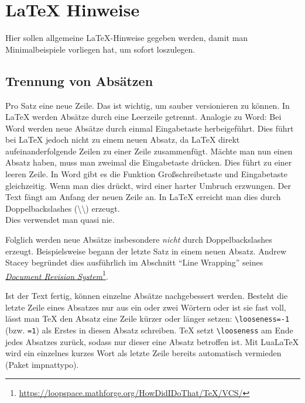 \documentclass[../main-german]{subfiles}
\begin{document}
\chapter{LaTeX Hinweise}
\label{sec:latexhints}

Hier sollen allgemeine \LaTeX-Hinweise gegeben werden, damit man Minimalbeispiele vorliegen hat, um sofort loszulegen.

\section{Trennung von Absätzen}

\begin{ltgexample}
Pro Satz eine neue Zeile.
Das ist wichtig, um sauber versionieren zu können.
In LaTeX werden Absätze durch eine Leerzeile getrennt.
Analogie zu Word: Bei Word werden neue Absätze durch einmal Eingabetaste herbeigeführt.
Dies führt bei LaTeX jedoch nicht zu einem neuen Absatz, da LaTeX direkt aufeinanderfolgende Zeilen zu einer Zeile zusammenfügt.
Mächte man nun einen Absatz haben, muss man zweimal die Eingabetaste drücken.
Dies führt zu einer leeren Zeile.
In Word gibt es die Funktion Großschreibetaste und Eingabetaste gleichzeitig.
Wenn man dies drückt, wird einer harter Umbruch erzwungen.
Der Text fängt am Anfang der neuen Zeile an.
In LaTeX erreicht man dies durch Doppelbackslashes (\textbackslash\textbackslash) erzeugt.
\\
Dies verwendet man quasi nie.

Folglich werden neue Absätze insbesondere \emph{nicht} durch Doppelbackslashes erzeugt.
Beispielsweise begann der letzte Satz in einem neuen Absatz.
Andrew Stacey begründet dies ausführlich im Abschnitt \enquote{Line Wrapping} seines \href{https://loopspace.mathforge.org/HowDidIDoThat/TeX/VCS/#section.3}{\emph{Document Revision System}}\footnote{\url{https://loopspace.mathforge.org/HowDidIDoThat/TeX/VCS/}}.
\end{ltgexample}

Ist der Text fertig, können einzelne Absätze nachgebessert werden.
Besteht die letzte Zeile eines Absatzes nur aus ein oder zwei Wörtern oder ist sie fast voll, lässt man TeX den Absatz eine Zeile kürzer oder länger setzen: \texttt{\textbackslash looseness=-1} (bzw. \texttt{=1}) als Erstes in diesen Absatz schreiben.
TeX setzt \texttt{\textbackslash looseness} am Ende jedes Absatzes zurück, sodass nur dieser eine Absatz betroffen ist.
Mit LuaLaTeX wird ein einzelnes kurzes Wort als letzte Zeile bereits automatisch vermieden (Paket impnattypo).
\end{document}
